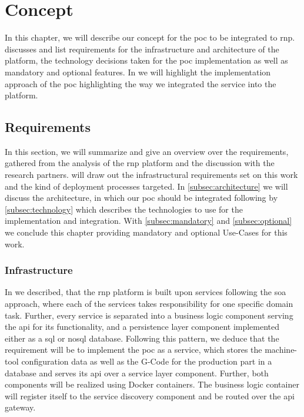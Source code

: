 \documentclass[
a4paper,
twoside,
headsepline,
cleardoublepage=empty,
parskip=half,
draft=false
]{scrbook}
\begin{document}
	\chapter{Concept} \label{ch:concept}

		In this chapter, we will describe our concept for the \gls{poc} to be integrated to \gls{rnp}.
		 discusses and list requirements for the infrastructure and architecture of the platform, the technology decisions taken for the \gls{poc} implementation as well as mandatory and optional features. In  we will highlight the implementation approach of the \gls{poc} highlighting the way we integrated the service into the platform.

		\section{Requirements} \label{sec:requirements}

			In this section, we will summarize and give an overview over the requirements, gathered from the analysis of the \gls{rnp} platform and the discussion with the research partners.
			 will draw out the infrastructural requirements set on this work and the kind of deployment processes targeted.
			In \cref{subsec:architecture} we will discuss the architecture, in which our \gls{poc} should be integrated following by \cref{subsec:technology} which describes the technologies to use for the implementation and integration.
			With \cref{subsec:mandatory} and \cref{subsec:optional} we conclude this chapter providing mandatory and optional Use-Cases for this work.

			\subsection{Infrastructure} \label{subsec:infrastructure}

				In  we described, that the \gls{rnp} platform is built upon services following the \gls{soa} approach, where each of the services takes responsibility for one specific domain task.
				Further, every service is separated into a business logic component serving the \gls{api} for its functionality, and a persistence layer component implemented either as a \gls{sql} or \gls{nosql} database.
				Following this pattern, we deduce that the requirement will be to implement the \gls{poc} as a service, which stores the machine-tool configuration data as well as the G-Code for the production part in a database and serves its \gls{api} over a service layer component.
				Further, both components will be realized using Docker containers.
				The business logic container will register itself to the service discovery component and be routed over the \gls{api} gateway.
\end{document}
